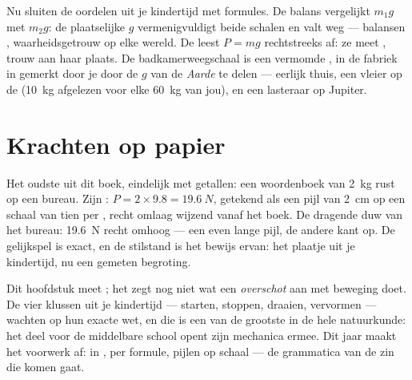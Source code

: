 \begin{remark}\label{rem:g9:weight-vs-mass:scales}
Nu sluiten de oordelen uit je kindertijd met formules. De balans
vergelijkt $m_1 g$ met $m_2 g$: de plaatselijke $g$ vermenigvuldigt
beide schalen en valt weg --- balansen 
\emph{}, waarheidsgetrouw op elke wereld. De
 leest $P = m g$ rechtstreeks af: ze
meet \emph{}, trouw aan haar plaats. De
badkamerweegschaal is een vermomde , in de fabriek
in  gemerkt door je  door de $g$ van
de \emph{Aarde} te delen --- eerlijk thuis, een vleier op de
 (\qty{10}{kg} afgelezen voor elke \qty{60}{kg} van jou),
en een lasteraar op Jupiter.
\end{remark}

\section{Krachten op papier}

\begin{example}\label{ex:g9:weight-vs-mass:book}
Het oudste  uit dit boek, eindelijk met getallen: een
woordenboek van \qty{2}{kg} rust op een bureau. Zijn
: $P = 2 \times 9.8 = \qty{19.6}{N}$, getekend als een
pijl van \qty{2}{cm} op een schaal van tien  per
, recht omlaag wijzend vanaf het boek. De dragende duw
van het bureau: \qty{19.6}{N} recht omhoog --- een even lange pijl, de
andere kant op. De gelijkspel is exact, en de stilstand is het bewijs
ervan: het plaatje uit je kindertijd, nu een gemeten begroting.
\end{example}

\begin{remark}\label{rem:g9:weight-vs-mass:dynamics}
Dit hoofdstuk meet ; het zegt nog niet
wat een \emph{overschot} aan  met beweging doet. De vier
klussen uit je kindertijd --- starten, stoppen, draaien, vervormen ---
wachten op hun exacte wet, en die is een van de grootste in de hele
natuurkunde: het deel voor de middelbare school opent zijn mechanica
ermee. Dit jaar maakt het voorwerk af:  in
,  per formule, pijlen op schaal ---
de grammatica van de zin die komen gaat.
\end{remark}

